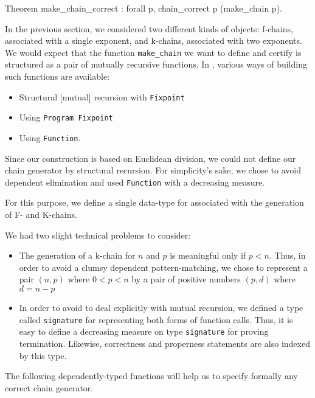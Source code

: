 \begin{Coqsrc}
Theorem make_chain_correct : 
   forall p, chain_correct p (make_chain p).  
\end{Coqsrc}


In the previous section, we  considered two different kinds of objects:
f-chains, associated with a single exponent, and k-chains, associated with two exponents. We would expect that the function \texttt{make\_chain} we want to define and certify is structured as a pair of mutually recursive functions.
 In \coq{} , various ways of building such functions are available:
 \begin{itemize}
 \item Structural [mutual] recursion with \texttt{Fixpoint}
 \item  Using \texttt{Program Fixpoint}
 \item Using   \texttt{Function}.
 \end{itemize}

Since our construction is based on Euclidean division, we could not
define our chain generator by structural recursion. 
For simplicity's sake, we chose to avoid dependent elimination
 and used \texttt{Function}  with a decreasing measure.

 For this purpose, we define a single data-type for associated with
 the generation of F- and K-chains.


We had two slight technical problems to consider:
\begin{itemize}
\item The generation of a k-chain for $n$ and $p$ is meaningful only if $p < n$. Thus, in order to avoid a clumsy  dependent pattern-matching, we chose to represent
     a pair $(n,p)$ where $0<p<n$ by a pair of positive numbers $(p,d)$ where 
     $d=n-p$
\item In order to avoid to deal explicitly with mutual recursion, we
     defined a type called \texttt{signature} for representing both
     forms of function calls.
     Thus, it is easy to define a decreasing measure on type 
     \texttt{signature} for proving termination. 
    Likewise, correctness and properness statements are also indexed by 
    this type.

\end{itemize}


The following dependently-typed functions will help us to specify  formally
any correct chain generator.

